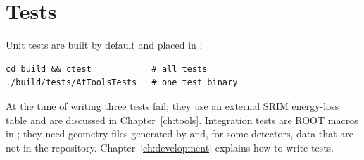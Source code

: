 \section{Tests}

Unit tests are built by default and placed in :
\begin{verbatim}
cd build && ctest            # all tests
./build/tests/AtToolsTests   # one test binary
\end{verbatim}
At the time of writing three  tests fail; they use an external SRIM energy-loss table and are
discussed in Chapter~\ref{ch:tools}. Integration tests are ROOT macros in ; they need geometry
files generated by  and, for some detectors, data that are not in the
repository. Chapter~\ref{ch:development} explains how to write tests.
